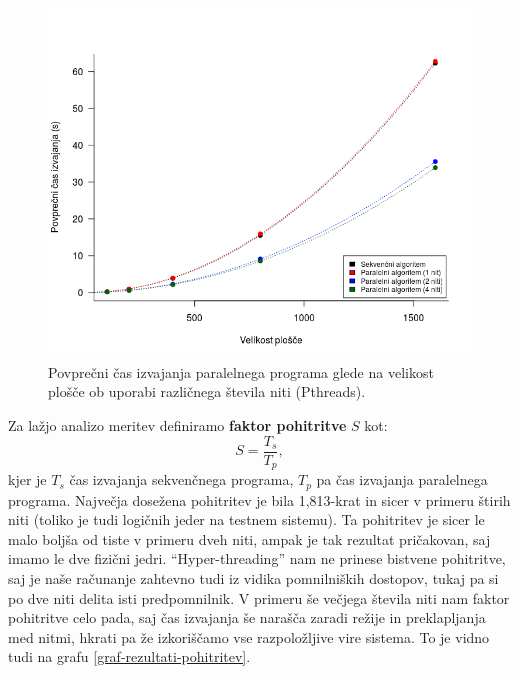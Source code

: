 \documentclass[a4paper,titlepage,11pt]{article}
\begin{document}
\begin{figure}[H]
\begin{center}
\includegraphics[scale=0.55]{graf-rezultati-2_1.png}
\caption{Povprečni čas izvajanja paralelnega programa glede na velikost plošče ob uporabi različnega števila niti (Pthreads).}
\label{graf-rezultati-2}
\end{center}
\vspace{-25pt}
\end{figure}

Za lažjo analizo meritev definiramo \textbf{faktor pohitritve} $S$ kot:
\begin{equation}
S = \frac{T_s}{T_p},
\end{equation}
kjer je $T_s$ čas izvajanja sekvenčnega programa, $T_p$ pa čas izvajanja paralelnega programa.
Največja dosežena pohitritev je bila 1,813-krat in sicer v primeru štirih niti (toliko je tudi logičnih jeder na testnem sistemu). Ta pohitritev je sicer le malo boljša od tiste v primeru dveh niti, ampak je tak rezultat pričakovan, saj imamo le dve fizični jedri. ``Hyper-threading'' nam ne prinese bistvene pohitritve, saj je naše računanje zahtevno tudi iz vidika pomnilniških dostopov, tukaj pa si po dve niti delita isti predpomnilnik. V primeru še večjega števila niti nam faktor pohitritve celo pada, saj čas izvajanja še narašča zaradi režije in preklapljanja med nitmi, hkrati pa že izkoriščamo vse razpoložljive vire sistema. To je vidno tudi na grafu \ref{graf-rezultati-pohitritev}.
\end{document}
